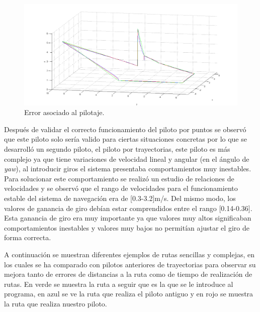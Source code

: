 \begin{figure}[H]
	\begin{center}
		\includegraphics[width=1.0\textwidth]{imag/IMG47.png}
				\caption{Error asociado al pilotaje.}
		\label{fig:Error asociado al pilotaje.}	
	\end{center}
\end{figure}

\hspace{1cm} Después de validar el correcto funcionamiento del piloto por puntos se observó que este piloto solo sería valido para ciertas situaciones concretas por lo que se desarrolló un segundo piloto, el piloto por trayectorias, este piloto es más complejo ya que tiene variaciones de velocidad lineal y angular (en el ángulo de \textit{yaw}), al introducir giros el sistema presentaba comportamientos muy inestables. Para solucionar este comportamiento se realizó un estudio de relaciones de velocidades y se observó que el rango de velocidades para el funcionamiento estable del sistema de navegación era de [0.3-3.2]m/s. Del mismo modo, los valores de ganancia de giro debían estar comprendidos entre el rango [0.14-0.36]. Esta ganancia de giro era muy importante ya que valores muy altos significaban comportamientos inestables y valores muy bajos no permitían ajustar el giro de forma correcta. 

\hspace{1cm} A continuación se muestran diferentes ejemplos de rutas sencillas y complejas, en los cuales se ha comparado con pilotos anteriores de trayectorias para observar su mejora tanto de errores de distancias a la ruta como de tiempo de realización de rutas. En verde se muestra la ruta a seguir que es la que se le introduce al programa, en azul se ve la ruta que realiza el piloto antiguo y en rojo se muestra la ruta que realiza nuestro piloto.

